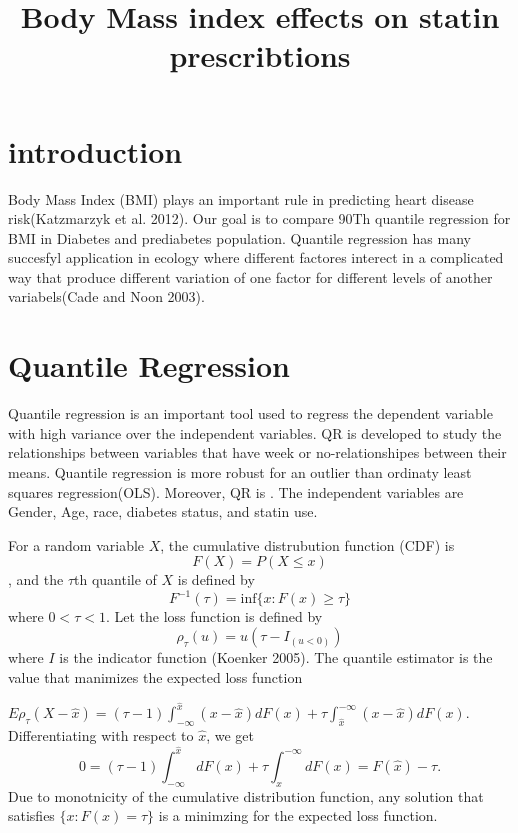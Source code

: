\documentclass[]{article}
\title{Body Mass index effects on statin prescribtions}
\author{}
\date{\vspace{-2.5em}}
\begin{document}
\maketitle

{
\setcounter{tocdepth}{2}
\tableofcontents
}
\section{introduction}

Body Mass Index (BMI) plays an important rule in predicting heart
disease risk(Katzmarzyk et al. 2012). Our goal is to compare 90Th
quantile regression for BMI in Diabetes and prediabetes population.
Quantile regression has many succesfyl application in ecology where
different factores interect in a complicated way that produce different
variation of one factor for different levels of another variabels(Cade
and Noon 2003).

\section{Quantile Regression}

Quantile regression is an important tool used to regress the dependent
variable with high variance over the independent variables. QR is
developed to study the relationships between variables that have week or
no-relationshipes between their means. Quantile regression is more
robust for an outlier than ordinaty least squares regression(OLS).
Moreover, QR is . The independent variables are Gender, Age, race,
diabetes status, and statin use.

For a random variable \(X\), the cumulative distrubution function (CDF)
is \[F(X)=P(X\leq x)\], and the \(\tau\)th quantile of \(X\) is defined
by \[ F^{-1}(\tau)=\text{inf}\{x: F(x)\ge \tau\} \] where \(0<\tau<1\).
Let the loss function is defined by
\[\rho_{\tau}(u)= u(\tau-I_{(u<0)})\] where \(I\) is the indicator
function (Koenker 2005). The quantile estimator is the value that
manimizes the expected loss function

\(E\rho_{\tau}(X-\hat{x})=(\tau-1)\int_{-\infty}^{\hat{x}} (x-\hat{x})dF(x)+\tau\int_{\hat{x}}^{-\infty} (x-\hat{x})dF(x).\)
Differentiating with respect to \(\hat{x}\), we get
\[ 0  =(\tau-1)\int_{-\infty}^{\hat{x}} dF(x)+\tau\int_{\hat{x}}^{-\infty} dF(x)
=F(\hat{x})-\tau.\] Due to monotnicity of the cumulative distribution
function, any solution that satisfies \(\{x:F(x)=\tau \}\) is a
minimzing for the expected loss function.
\end{document}
